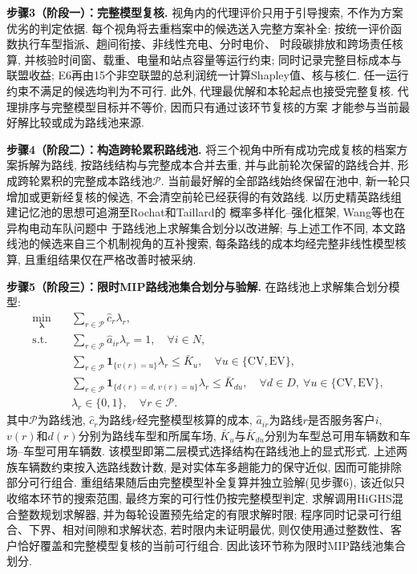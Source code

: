 \documentclass{setp-new}
\begin{document}
\textbf{步骤3（阶段一）：完整模型复核.}
视角内的代理评价只用于引导搜索, 不作为方案优劣的判定依据.
每个视角将去重档案中的候选送入完整方案补全:
按统一评价函数执行车型指派、趟间衔接、非线性充电、分时电价、
时段碳排放和跨场责任核算, 并核验时间窗、载重、电量和站点容量等运行约束;
同时记录完整目标成本与联盟收益;
E6再由15个非空联盟的总利润统一计算Shapley值、核与核仁.
任一运行约束不满足的候选均判为不可行.
此外, 代理最优解和本轮起点也接受完整复核.
代理排序与完整模型目标并不等价, 因而只有通过该环节复核的方案
才能参与当前最好解比较或成为路线池来源.

\textbf{步骤4（阶段二）：构造跨轮累积路线池.}
将三个视角中所有成功完成复核的档案方案拆解为路线, 按路线结构与完整成本合并去重,
并与此前轮次保留的路线合并, 形成跨轮累积的完整成本路线池$\mathcal P$.
当前最好解的全部路线始终保留在池中, 新一轮只增加或更新经复核的候选,
不会清空前轮已经获得的有效路线.
以历史精英路线组建记忆池的思想可追溯至Rochat和Taillard\cite{ref:79}的
概率多样化--强化框架, Wang等\cite{ref:80}也在异构电动车队问题中
于路线池上求解集合划分以改进解; 与上述工作不同,
本文路线池的候选来自三个机制视角的互补搜索,
每条路线的成本均经完整非线性模型核算,
且重组结果仅在严格改善时被采纳.

\textbf{步骤5（阶段三）：限时MIP路线池集合划分与验解.}
在路线池上求解集合划分模型:
\begin{equation}
\begin{aligned}
\min_{\boldsymbol\lambda}\quad
& \sum_{r\in\mathcal P}\hat c_r\lambda_r,\\
\mathrm{s.t.}\quad
& \sum_{r\in\mathcal P}\hat a_{ir}\lambda_r=1,
  \quad \forall i\in N,\\
& \sum_{r\in\mathcal P}\mathbf 1_{\{v(r)=u\}}\lambda_r\le \bar K_u,
  \quad \forall u\in\{\mathrm{CV},\mathrm{EV}\},\\
& \sum_{r\in\mathcal P}
  \mathbf 1_{\{d(r)=d,\,v(r)=u\}}\lambda_r\le \bar K_{du},
  \quad \forall d\in D,\ \forall u\in\{\mathrm{CV},\mathrm{EV}\},\\
& \lambda_r\in\{0,1\},
  \quad \forall r\in\mathcal P.
\end{aligned}
\label{eq:sp-recombination}
\end{equation}
其中$\mathcal P$为路线池, $\hat c_r$为路线$r$经完整模型核算的成本,
$\hat a_{ir}$为路线$r$是否服务客户$i$, $v(r)$和$d(r)$分别为路线车型和所属车场,
$\bar K_u$与$\bar K_{du}$分别为车型总可用车辆数和车场--车型可用车辆数.
该模型即第二层模式选择结构在路线池上的显式形式.
上述两族车辆数约束按入选路线数计数, 是对实体车多趟能力的保守近似,
因而可能排除部分可行组合. 重组结果随后由完整模型补全复算并独立验解(见步骤6),
该近似只收缩本环节的搜索范围, 最终方案的可行性仍按完整模型判定.
求解调用HiGHS混合整数规划求解器\cite{ref:81}, 并为每轮设置预先给定的有限求解时限;
程序同时记录可行组合、下界、相对间隙和求解状态,
若时限内未证明最优, 则仅使用通过整数性、客户恰好覆盖和完整模型复核的当前可行组合.
因此该环节称为限时MIP路线池集合划分.
\end{document}
